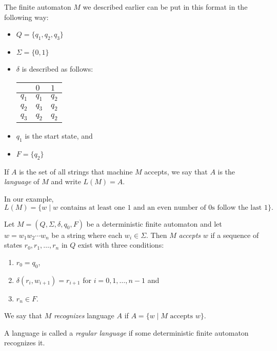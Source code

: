 \begin{example}
The finite automaton $M$ we described earlier can be put in this format in the following way: 
\begin{itemize}
    \item $Q=\{q_1,q_2,q_3\}$
    \item $\Sigma=\{0,1\}$
    \item $\delta$ is described as follows:
    \begin{center}
        \begin{tabular}{l|ll}
            & $0$  & $1$   \\ \hline
            $q_1$ & $q_1$   & $q_2$\\
            $q_2$ & $q_3$ & $q_2$\\
            $q_3$ & $q_2$ & $q_2$
        \end{tabular}
    \end{center}
    \item $q_1$ is the start state, and
    \item $F=\{q_2\}$
\end{itemize}
\end{example}

If $A$ is the set of all strings that machine $M$ accepts, we say that $A$ is the \textit{language} of $M$ and write $L(M)=A$.

In our example, $$L(M)=\{w\mid w\text{ contains at least one $1$ and an even number of $0$s follow the last $1$}\}.$$

\begin{definition}
Let $M=(Q,\Sigma, \delta, q_0, F)$ be a deterministic finite automaton and let $w=w_1w_2\cdots w_n$ be a string where each $w_i\in\Sigma$. Then $M$ \textit{accepts} $w$ if a sequence of states $r_0, r_1, \ldots, r_n$ in $Q$ exist with three conditions:
\begin{enumerate}
    \item $r_0=q_0$,
    \item $\delta(r_i, w_{i+1})=r_{i+1}$ for $i=0,1,\ldots, n-1$ and
    \item $r_n\in F$.
\end{enumerate}

We say that $M$ \textit{recognizes} language $A$ if $A=\{w\mid M\text{ accepts }w\}$.
\end{definition}
\begin{definition}
A language is called a \textit{regular language} if some deterministic finite automaton recognizes it.
\end{definition}

